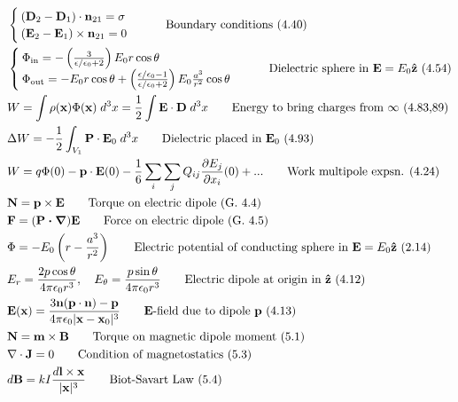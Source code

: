 \documentclass[10pt]{article}
\newcommand{\zhat}{\boldsymbol{\hat{\textbf{z}}}}
\newcommand{\ve}[1]{\boldsymbol{\mathbf{#1}}}
\newcommand{\vect}[1]{\boldsymbol{\mathbf{#1}}}
\newcommand{\eo}{\epsilon_0}
\newcommand{\pder}[2]{\frac{\partial #1}{\partial #2}}
\begin{document}
\begin{multicols}{2}
\begin{align*}
		& \begin{cases}
			(\vect{D}_2 - \vect{D}_1) \cdot \vect{n}_{21} = \sigma \\
			(\vect{E}_2 - \vect{E}_1) \times \vect{n}_{21} = 0 \\
		\end{cases}	\tag*{Boundary conditions (4.40)} \\
		&\begin{cases}
			\Phi_{\text{in}} = - \left( \frac{3}{\epsilon/\eo + 2} \right) E_0 r \cos \theta \\ 
			\Phi_{\text{out}} = - E_0 r \cos \theta + \left( \frac{\epsilon/\eo - 1}{\epsilon/\eo + 2} \right) E_0 \frac{a^3}{r^2} \cos \theta 
		\end{cases} \tag*{Dielectric sphere in $\vect{E} = E_0 \zhat$ (4.54)} \\
		& W = \int \rho(\vect{x}) \Phi(\vect{x})\; d^3x = \frac{1}{2} \int \vect{E} \cdot \vect{D} \; d^3x \tag*{Energy to bring charges from $\infty$ (4.83,89)} \\	
		& \Delta W = - \frac{1}{2} \int_{V_1} \vect{P} \cdot \vect{E}_0 \; d^3 x \tag*{Dielectric placed in $\vect{E}_0$ (4.93)} \\
		& W = q \Phi(0) - \vect{p} \cdot \vect{E}(0) - \frac{1}{6} \sum_i \sum_j Q_{ij} \pder{E_j}{x_i}(0) + ... \tag*{Work multipole expsn. (4.24)} \\
		&\ve{N} = \ve{p} \times \ve{E} \tag*{Torque on electric dipole (G. 4.4)} \\
		& \ve{F} = (\ve{P \cdot \nabla}) \ve{E} \tag*{Force on electric dipole (G. 4.5)} \\
		& \Phi = -E_0 \left( r - \frac{a^3}{r^2} \right)	\tag*{Electric potential of conducting sphere in $\vect{E} = E_0 \zhat$ (2.14)} \\
		& E_r=\frac{2 p \cos \theta}{4 \pi \eo r^3}, \quad E_\theta=\frac{p \sin \theta}{4 \pi \eo r^3} \tag*{Electric dipole at origin in $\zhat$ (4.12)} \\
		& \vect{E}(\vect{x}) = \frac{3 \vect{n}(\vect{p} \cdot \vect{n}) - \vect{p}}{4 \pi \eo |\vect{x} - \vect{x}_0|^3} \tag*{$\vect{E}$-field due to dipole $\vect{p}$ (4.13)} \\
		& \vect{N} = \vect{m} \times \vect{B} \tag*{Torque on magnetic dipole moment (5.1)} \\
		& \nabla \cdot \vect{J} = 0 \tag*{Condition of magnetostatics (5.3)} \\
		& d \vect{B} = k I \frac{d \vect{l} \times \vect{x}}{|\vect{x}|^3} \tag*{Biot-Savart Law (5.4)} \\

\end{align*}
\end{multicols}
\end{document}
